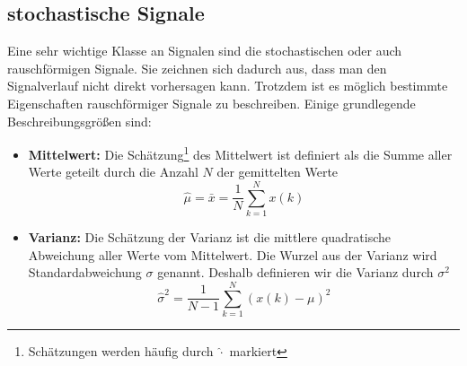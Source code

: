 \subsection{stochastische Signale \label{sec:stochastEinfuehrung}}
Eine sehr wichtige Klasse an Signalen sind die stochastischen oder
auch rauschförmigen Signale. Sie zeichnen sich dadurch aus, dass
man den Signalverlauf nicht direkt vorhersagen kann. Trotzdem
ist es möglich bestimmte Eigenschaften rauschförmiger Signale
zu beschreiben. Einige grundlegende Beschreibungsgrößen sind:

\begin{itemize}
\item{{\bf Mittelwert:} Die Schätzung\footnote{Schätzungen werden häufig durch $\hat{\cdot}$ markiert}
des Mittelwert ist definiert als die Summe aller
Werte geteilt durch die Anzahl $N$ der gemittelten Werte
\begin{equation}
    \hat{\mu} = \bar{x} = \frac{1}{N} \sum_{k = 1}^{N} x(k)
\end{equation}
}
\item{{\bf Varianz:} Die Schätzung der Varianz ist die mittlere quadratische Abweichung aller Werte vom Mittelwert.
Die Wurzel aus der Varianz wird Standardabweichung $\sigma$ genannt. Deshalb definieren wir die
Varianz durch $\sigma^2$
\begin{equation}
    \hat{\sigma}^2 = \frac{1}{N-1} \sum_{k = 1}^{N} (x(k)-\mu)^2
\end{equation}
}


\end{itemize}
